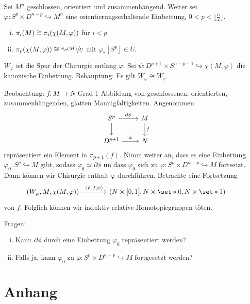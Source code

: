 \begin{lemma}
	Sei $M^n$ geschlossen, orientiert und zusammenhängend.
	Weiter sei $\varphi \colon S^p \times D^{n-p} \hookrightarrow M^n$ eine orientierungserhaltende Einbettung, $0 < p < \lfloor \frac{n}{2} \rfloor$.
	\begin{enumerate}[(i)]
		\item $\pi_i(M) \cong \pi_i \enbrace*{\chi(M,\varphi)}$ für $i<p$
		\item $\pi_p \enbrace*{\chi(M,\varphi)} \cong \sfrac{\pi_p(M)}{U}$ mit $\varphi_*[S^p] \in U$.
	\end{enumerate}
\end{lemma}
\begin{beweis}[Skizze]
	$W_\varphi$ ist die Spur der Chirurgie entlang $\varphi$. 
	Sei $\psi \colon D^{p+1} \times S^{n-p-1} \hookrightarrow \chi(M,\varphi)$ die kanonische Einbettung.
	Behauptung: Es gilt $W_\varphi \cong W_\psi$
	
\end{beweis}

Beobachtung: $f \colon M \to N$ Grad 1-Abbildung von geschlossenen, orientierten, zusammenhängenden, glatten Mannigfaltigkeiten.
Angenommen
\[
	\begin{tikzcd}
		S^p \rar["\partial \phi"] \dar & M \dar["f"] \\
		D^{p+1} \rar["\phi"] & N
	\end{tikzcd}
\]
repräsentiert ein Element in $\pi_{p+1}(f)$.
Nimm weiter an, dass es eine Einbettung $\varphi_0\colon S^p \hookrightarrow M$ gibt, sodass $\varphi_0 \simeq \partial \phi$ un dass $\varphi_0$ sich zu $\varphi \colon S^p \times D^{n-p} \hookrightarrow M$ fortsetzt.
Dann können wir Chirurgie enthalt $\varphi$ durchführen.
Betrachte eine Fortsetzung
\[
	\begin{tikzcd}[sep=large]
		\enbrace*{W_\varphi,M,\chi(M,\varphi)} \rar["{(F,f,\psi)}"] & \enbrace*{N \times [0,1], N \times \set*{0}, N \times \set*{1}}
	\end{tikzcd}
\]
von $f$.
Folglich können wir induktiv relative Homotopiegruppen töten.

Fragen:
\begin{enumerate}[(i)]
	\item Kann $\partial \phi$ durch eine Einbettung $\varphi_0$ repräsentiert werden?
	\item Falls ja, kann $\varphi_0$ zu $\varphi \colon S^p \times D^{n-p} \hookrightarrow M$ fortgesetzt werden?
\end{enumerate}

\cleardoubleoddemptypage
{}
\setcounter{page}{1}
\cleardoubleoddemptypage
\appendix

\section{Anhang} %
\label{sec:anhang}

\printindex
\printbibliography
\listoffigures
\todototoc
{}


